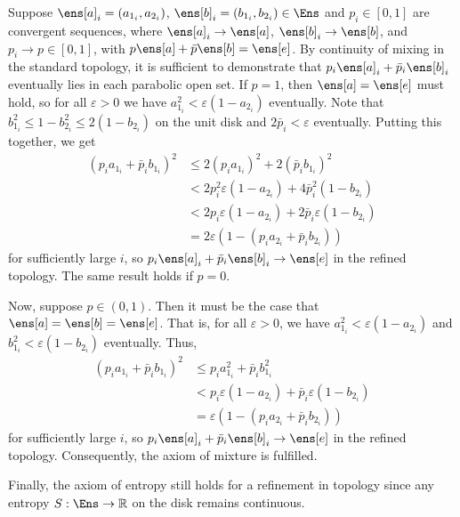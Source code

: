 \begin{example}
	Suppose $\ens[a]_i = (a_{1_i},a_{2_i})$, $\ens[b]_i = (b_{1_i},b_{2_i}) \in \Ens$ and $p_i \in [0,1]$ are convergent sequences, where $\ens[a]_i \to \ens[a]$, $\ens[b]_i \to \ens[b]$, and $p_i \to p \in [0,1]$, with $p\ens[a] + \bar{p}\ens[b] = \ens[e]$. By continuity of mixing in the standard topology, it is sufficient to demonstrate that $p_i\ens[a]_i + \bar{p}_i\ens[b]_i$ eventually lies in each parabolic open set. If $p = 1$, then $\ens[a] = \ens[e]$ must hold, so for all $\varepsilon > 0$ we have $a_{1_i}^2 < \varepsilon(1-a_{2_i})$ eventually. Note that $b_{1_i}^2 \le 1 - b_{2_i}^2 \le 2(1 - b_{2_i})$ on the unit disk and $2\bar{p}_i < \varepsilon$ eventually. Putting this together, we get
	\begin{equation}
		\begin{aligned}
			(p_ia_{1_i} + \bar{p}_ib_{1_i})^2 
			&\le 2(p_ia_{1_i})^2 + 2(\bar{p}_ib_{1_i})^2 \\
			&< 2p_i^2\varepsilon(1 - a_{2_i}) + 4\bar{p}_i^2(1 - b_{2_i}) \\ 
			&< 2p_i\varepsilon(1 - a_{2_i}) + 2\bar{p}_i\varepsilon(1 - b_{2_i}) \\
			&= 2\varepsilon(1 - (p_ia_{2_i} + \bar{p}_ib_{2_i}))
		\end{aligned}
	\end{equation}
	for sufficiently large $i$, so $p_i\ens[a]_i+\bar{p}_i\ens[b]_i \to \ens[e]$ in the refined topology. The same result holds if $p = 0$.
	
	Now, suppose $p \in (0,1)$. Then it must be the case that $\ens[a] = \ens[b] = \ens[e]$. That is, for all $\varepsilon > 0$, we have $a_{1_i}^2 < \varepsilon(1-a_{2_i})$ and $b_{1_i}^2 < \varepsilon(1-b_{2_i})$ eventually. Thus,
	\begin{equation}
		\begin{aligned}
			(p_ia_{1_i}+\bar{p}_ib_{1_i})^2 &\le p_ia_{1_i}^2 + \bar{p}_ib_{1_i}^2 \\
			&< p_i\varepsilon(1 - a_{2_i}) + \bar{p}_i\varepsilon(1 - b_{2_i}) \\
			&= \varepsilon(1 - (p_ia_{2_i} + \bar{p}_ib_{2_i}))
		\end{aligned}
	\end{equation}
	for sufficiently large $i$, so $p_i\ens[a]_i+\bar{p}_i\ens[b]_i \to \ens[e]$ in the refined topology. Consequently, the axiom of mixture is fulfilled.
	
	Finally, the axiom of entropy still holds for a refinement in topology since any entropy $S : \Ens \to \mathbb{R}$ on the disk remains continuous.
	

\end{example}

